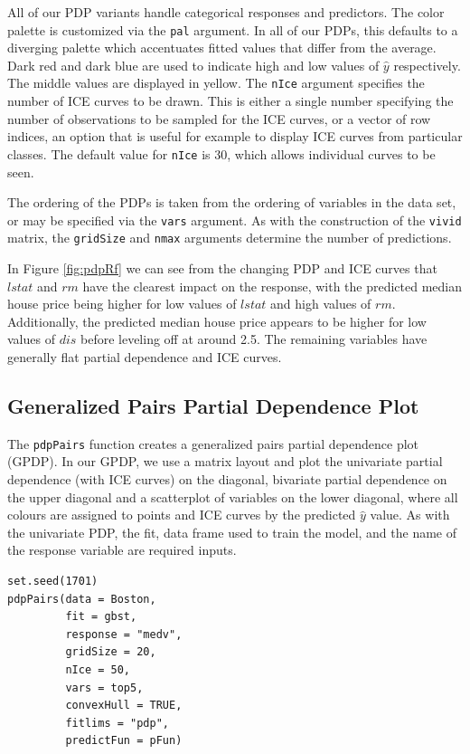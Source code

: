 All of our PDP variants handle categorical responses and predictors. The color palette is customized via the \texttt{pal} argument. In all of our PDPs, this defaults to a diverging palette which accentuates fitted values that differ from the average. Dark red and dark blue are used to indicate high and low values of \(\hat{y}\) respectively. The middle values are displayed in yellow. The \texttt{nIce} argument specifies the number of ICE curves to be drawn. This is either a single number specifying the number of observations to be sampled for the ICE curves, or a vector of row indices, an option that is useful for example to display ICE curves from particular classes. The default value for \texttt{nIce} is 30, which allows individual curves to be seen.

The ordering of the PDPs is taken from the ordering of variables in the data set, or may be specified via the \texttt{vars} argument. As with the construction of the \texttt{vivid} matrix, the \texttt{gridSize} and \texttt{nmax} arguments determine the number of predictions.

In Figure \ref{fig:pdpRf} we can see from the changing PDP and ICE curves that \(lstat\) and \(rm\) have the clearest impact on the response, with the predicted median house price being higher for low values of \(lstat\) and high values of \(rm\). Additionally, the predicted median house price appears to be higher for low values of \(dis\) before leveling off at around 2.5. The remaining variables have generally flat partial dependence and ICE curves.

\hypertarget{generalized-pairs-partial-dependence-plot}{%
\subsection{Generalized Pairs Partial Dependence Plot}\label{generalized-pairs-partial-dependence-plot}}

The \texttt{pdpPairs} function creates a generalized pairs partial dependence plot (GPDP). In our GPDP, we use a matrix layout and plot the univariate partial dependence (with ICE curves) on the diagonal, bivariate partial dependence on the upper diagonal and a scatterplot of variables on the lower diagonal, where all colours are assigned to points and ICE curves by the predicted \(\hat{y}\) value. As with the univariate PDP, the fit, data frame used to train the model, and the name of the response variable are required inputs.

\begin{verbatim}
set.seed(1701)
pdpPairs(data = Boston,
         fit = gbst,
         response = "medv",
         gridSize = 20,
         nIce = 50,
         vars = top5,
         convexHull = TRUE,
         fitlims = "pdp",
         predictFun = pFun)
\end{verbatim}

